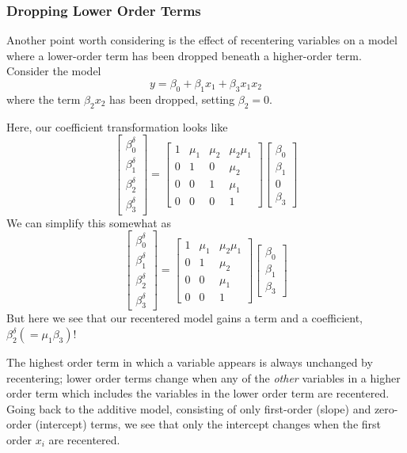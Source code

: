 \documentclass[]{article}
\begin{document}
\hypertarget{dropping-lower-order-terms}{%
\subsubsection{Dropping Lower Order
Terms}\label{dropping-lower-order-terms}}

Another point worth considering is the effect of recentering variables
on a model where a lower-order term has been dropped beneath a
higher-order term. Consider the model
\[y = \beta_0 + \beta_1x_1 + \beta_3x_1x_2\] where the term
\(\beta_2x_2\) has been dropped, setting \(\beta_2=0\).

Here, our coefficient transformation looks like
\[\begin{bmatrix}\beta_0^\delta \\ \beta_1^\delta \\ \beta_2^\delta \\ \beta_3^\delta \end{bmatrix}=
\begin{bmatrix} 1 & \mu_1 &\mu_2 &\mu_2\mu_1 \\
  0 &1 &0 &\mu_2 \\ 0 &0 &1 &\mu_1 \\ 0 &0 &0 &1 \end{bmatrix}
\begin{bmatrix}\beta_0 \\ \beta_1 \\ 0 \\ \beta_3 \end{bmatrix}\] We can
simplify this somewhat as
\[\begin{bmatrix}\beta_0^\delta \\ \beta_1^\delta \\ \beta_2^\delta \\ \beta_3^\delta \end{bmatrix}=
\begin{bmatrix} 1 & \mu_1 &\mu_2\mu_1 \\
  0 &1 &\mu_2 \\ 0 &0 &\mu_1 \\ 0 &0 &1 \end{bmatrix}
\begin{bmatrix}\beta_0 \\ \beta_1 \\ \beta_3 \end{bmatrix}\] But here we
see that our recentered model gains a term and a coefficient,
\(\beta_2^\delta (=\mu_1\beta_3)\)!

The highest order term in which a variable appears is always unchanged
by recentering; lower order terms change when any of the \emph{other}
variables in a higher order term which includes the variables in the
lower order term are recentered. Going back to the additive model,
consisting of only first-order (slope) and zero-order (intercept) terms,
we see that only the intercept changes when the first order \(x_i\) are
recentered.
\end{document}
